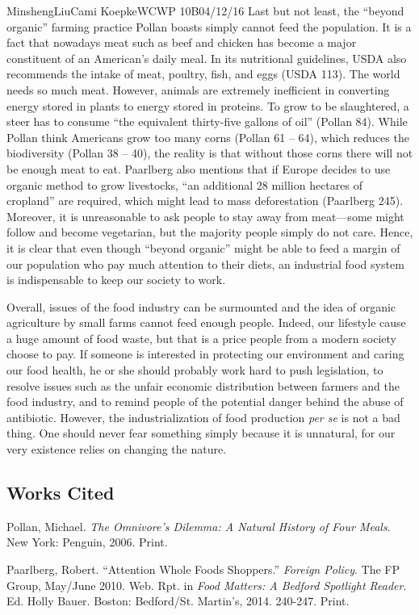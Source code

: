 \documentclass[12pt,letterpaper]{article}
\begin{document}
\begin{mla}{Minsheng}{Liu}{Cami Koepke}{WCWP 10B}{04/12/16}
Last but not least, the ``beyond organic'' farming practice Pollan
boasts simply cannot feed the population. It is a fact that nowadays
meat such as beef and chicken has become a major constituent of an
American's daily meal. In its nutritional guidelines, USDA also
recommends the intake of meat, poultry, fish, and eggs (USDA 113). The
world needs so much meat. However, animals are extremely inefficient in
converting energy stored in plants to energy stored in proteins. To grow
to be slaughtered, a steer has to consume ``the equivalent thirty-five
gallons of oil'' (Pollan 84). While Pollan think Americans grow too many
corns (Pollan 61 -- 64), which reduces the biodiversity (Pollan 38 --
40), the reality is that without those corns there will not be enough
meat to eat. Paarlberg also mentions that if Europe decides to use
organic method to grow livestocks, ``an additional 28 million hectares
of cropland'' are required, which might lead to mass deforestation
(Paarlberg 245). Moreover, it is unreasonable to ask people to stay away
from meat---some might follow and become vegetarian, but the majority
people simply do not care. Hence, it is clear that even though ``beyond
organic'' might be able to feed a margin of our population who pay much
attention to their diets, an industrial food system is indispensable to
keep our society to work.

Overall, issues of the food industry can be surmounted and the idea of
organic agriculture by small farms cannot feed enough people. Indeed,
our lifestyle cause a huge amount of food waste, but that is a price
people from a modern society choose to pay. If someone is interested in
protecting our environment and caring our food health, he or she should
probably work hard to push legislation, to resolve issues such as the
unfair economic distribution between farmers and the food industry, and
to remind people of the potential danger behind the abuse of antibiotic.
However, the industrialization of food production \emph{per se} is not a
bad thing. One should never fear something simply because it is
unnatural, for our very existence relies on changing the nature.

\subsection*{Works Cited}
\bibent Pollan, Michael. \textit{The Omnivore's Dilemma: A Natural History of Four Meals}. New York: Penguin, 2006. Print.

\bibent Paarlberg, Robert. ``Attention Whole Foods Shoppers.'' \textit{Foreign Policy}. The FP Group, May/June 2010. Web. Rpt. in \textit{Food Matters: A Bedford Spotlight Reader}. Ed. Holly Bauer. Boston: Bedford/St. Martin’s, 2014. 240-247. Print.


\end{mla}
\end{document}
